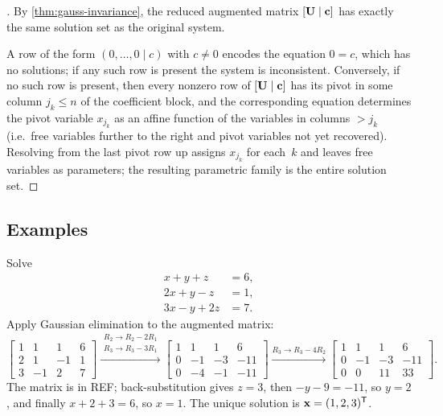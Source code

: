 \begin{proof}[]
By \cref{thm:gauss-invariance}, the reduced augmented matrix
$[\mathbf{U} \mid \mathbf{c}]$ has exactly the same solution set as the
original system.

A row of the form $(0, \dots, 0 \mid c)$ with $c \neq 0$ encodes the
equation $0 = c$, which has no solutions; if any such row is present
the system is inconsistent. Conversely, if no such row is present, then
every nonzero row of $[\mathbf{U} \mid \mathbf{c}]$ has its pivot in some
column $j_k \le n$ of the coefficient block, and the corresponding
equation determines the pivot variable $x_{j_k}$ as an affine function
of the variables in columns $> j_k$ (i.e.\ free variables further to
the right and pivot variables not yet recovered). Resolving from the
last pivot row up assigns $x_{j_k}$ for each~$k$ and leaves free
variables as parameters; the resulting parametric family is the entire
solution set.
\end{proof}

\subsection*{Examples}

\begin{example}
\label{ex:gauss-unique}
Solve
\[
  \begin{aligned}
    x + y + z &= 6, \\
    2x + y - z &= 1, \\
    3x - y + 2z &= 7.
  \end{aligned}
\]
Apply Gaussian elimination to the augmented matrix:
\[
  \left[\begin{array}{rrr|r}
    1 &  1 &  1 & 6 \\
    2 &  1 & -1 & 1 \\
    3 & -1 &  2 & 7
  \end{array}\right]
  \xrightarrow{\substack{R_2 \to R_2 - 2R_1 \\ R_3 \to R_3 - 3R_1}}
  \left[\begin{array}{rrr|r}
    1 &  1 &  1 &   6 \\
    0 & -1 & -3 & -11 \\
    0 & -4 & -1 & -11
  \end{array}\right]
  \xrightarrow{R_3 \to R_3 - 4R_2}
  \left[\begin{array}{rrr|r}
    1 &  1 &  1 &   6 \\
    0 & -1 & -3 & -11 \\
    0 &  0 & 11 &  33
  \end{array}\right].
\]
The matrix is in REF; back-substitution gives $z = 3$, then
$-y - 9 = -11$, so $y = 2$, and finally $x + 2 + 3 = 6$, so $x = 1$.
The unique solution is $\mathbf{x} = (1, 2, 3)^{\mathsf{T}}$.
\end{example}

